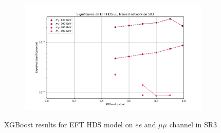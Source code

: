 \documentclass[12pt, a4paper]{book}
\begin{document}
\begin{figure}[!ht]
\begin{subfigure}[b]{0.49\textwidth}
   \end{subfigure}
   \hfill
   \begin{subfigure}[b]{0.49\textwidth}
      \centering
      \includegraphics[width=1\textwidth]{XGBoost/Model_independent/150/EFT_HDS/EXP_SIG_uu.pdf}
   \end{subfigure}
   \caption{XGBoost results for EFT HDS model on $ee$ and $\mu\mu$ channel in SR3}\label{fig:EFT_HDS_SR3}
\end{figure}
\end{document}
